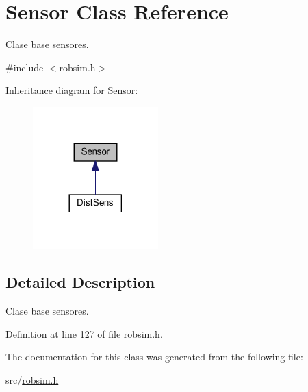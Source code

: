 \hypertarget{classSensor}{}\section{Sensor Class Reference}
\label{classSensor}


Clase base sensores.  




{\ttfamily \#include $<$robsim.\+h$>$}



Inheritance diagram for Sensor\+:\nopagebreak
\begin{figure}[H]
\begin{center}
\leavevmode
\includegraphics[width=137pt]{classSensor__inherit__graph}
\end{center}
\end{figure}


\subsection{Detailed Description}
Clase base sensores. 

Definition at line 127 of file robsim.\+h.



The documentation for this class was generated from the following file\+:\begin{DoxyCompactItemize}
\item 
src/\hyperlink{robsim_8h}{robsim.\+h}\end{DoxyCompactItemize}

